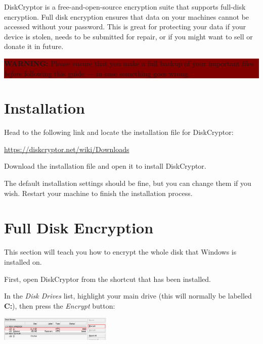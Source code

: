 \documentclass[10.5pt,a4paper]{article}
\begin{document}
\begin{multicols*}{2}

DiskCryptor is a free-and-open-source encryption suite that supports full-disk encryption. Full disk encryption ensures that data on your machines cannot be accessed without your password. This is great for protecting your data if your device is stolen, needs to be submitted for repair, or if you might want to sell or donate it in future.

\begin{center}
	\vspace{0.25cm}
	\colorbox{Maroon}{
		\begin{minipage}{8cm}
			\color{white}
			\vspace{0.1cm}
			\textbf{WARNING:} Please ensure that you make a full backup of your important files \textit{before} following this guide --- in case something goes wrong.
			\vspace{0.1cm}
		\end{minipage}
	}
\end{center}

\section*{Installation}
Head to the following link and locate the installation file for DiskCryptor:

\begin{center}
	\url{https://diskcryptor.net/wiki/Downloads}
\end{center}

Download the installation file and open it to install DiskCryptor.

The default installation settings should be fine, but you can change them if you wish. Restart your machine to finish the installation process.

\section*{Full Disk Encryption}
This section will teach you how to encrypt the whole disk that Windows is installed on.

First, open DiskCryptor from the shortcut that has been installed.

In the \textit{Disk Drives} list, highlight your main drive (this will normally be labelled \textbf{C:}), then press the \textit{Encrypt} button:

\begin{center}
	\includegraphics[width=0.40\textwidth]{select-drive.png}
\end{center}


\end{multicols*}
\end{document}
